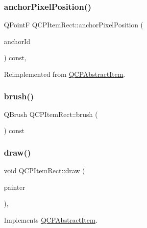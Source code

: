 \subsubsection{\texorpdfstring{anchorPixelPosition()}{anchorPixelPosition()}}
{\footnotesize\ttfamily Q\+PointF Q\+C\+P\+Item\+Rect\+::anchor\+Pixel\+Position (\begin{DoxyParamCaption}\item[{int}]{anchor\+Id }\end{DoxyParamCaption}) const\hspace{0.3cm}{\ttfamily [protected]}, {\ttfamily [virtual]}}



Reimplemented from \mbox{\hyperlink{class_q_c_p_abstract_item_ada5bad4e1196c4fc0d0d12328e24b8f2}{Q\+C\+P\+Abstract\+Item}}.

\mbox{\label{class_q_c_p_item_rect_a5071d7fd864428a1398152aca87b54ad}} 
\subsubsection{\texorpdfstring{brush()}{brush()}}
{\footnotesize\ttfamily Q\+Brush Q\+C\+P\+Item\+Rect\+::brush (\begin{DoxyParamCaption}{ }\end{DoxyParamCaption}) const\hspace{0.3cm}{\ttfamily [inline]}}

\mbox{\label{class_q_c_p_item_rect_a3c492960d0fc038cf1b60578b62b6cdc}} 
\subsubsection{\texorpdfstring{draw()}{draw()}}
{\footnotesize\ttfamily void Q\+C\+P\+Item\+Rect\+::draw (\begin{DoxyParamCaption}\item[{\mbox{\hyperlink{class_q_c_p_painter}{Q\+C\+P\+Painter}} $\ast$}]{painter }\end{DoxyParamCaption})\hspace{0.3cm}{\ttfamily [protected]}, {\ttfamily [virtual]}}



Implements \mbox{\hyperlink{class_q_c_p_abstract_item_a007fdab79c935a5da5aa04a21d268c18}{Q\+C\+P\+Abstract\+Item}}.

